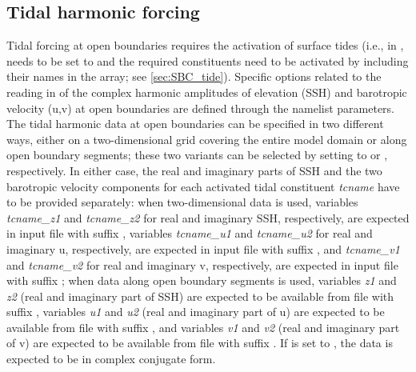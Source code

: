 \documentclass[../main/NEMO_manual]{subfiles}
\begin{document}
\subsection{Tidal harmonic forcing}
\label{subsec:LBC_bdy_tides}

\begin{listing}
  \caption{}
  \label{lst:nambdy_tide}
\end{listing}

Tidal forcing at open boundaries requires the activation of surface
tides (i.e., in ,  needs to be set to
 and the required constituents need to be activated by
including their names in the  array; see
\autoref{sec:SBC_tide}). Specific options related to the reading in of
the complex harmonic amplitudes of elevation (SSH) and barotropic
velocity (u,v) at open boundaries are defined through the
 namelist parameters.\\

The tidal harmonic data at open boundaries can be specified in two
different ways, either on a two-dimensional grid covering the entire
model domain or along open boundary segments; these two variants can
be selected by setting  to  or
, respectively. In either case, the real and
imaginary parts of SSH and the two barotropic velocity components for
each activated tidal constituent \textit{tcname} have to be provided
separately: when two-dimensional data is used, variables
\textit{tcname\_z1} and \textit{tcname\_z2} for real and imaginary SSH,
respectively, are expected in input file  with suffix
, variables \textit{tcname\_u1} and
\textit{tcname\_u2} for real and imaginary u, respectively, are
expected in input file  with suffix , and
\textit{tcname\_v1} and \textit{tcname\_v2} for real and imaginary v,
respectively, are expected in input file  with suffix
; when data along open boundary segments is used,
variables \textit{z1} and \textit{z2} (real and imaginary part of SSH)
are expected to be available from file  with suffix
, variables \textit{u1} and \textit{u2} (real
and imaginary part of u) are expected to be available from file
 with suffix , and variables
\textit{v1} and \textit{v2} (real and imaginary part of v) are
expected to be available from file  with suffix
. If  is set to
, the data is expected to be in complex conjugate
form.
\end{document}
